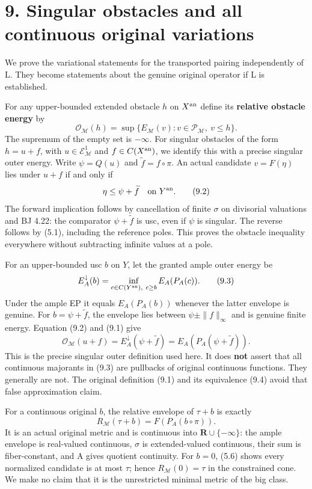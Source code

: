 \documentclass[
  10pt,
]{article}
\begin{document}
\section{9. Singular obstacles and all continuous original
variations}\label{singular-obstacles-and-all-continuous-original-variations}

We prove the variational statements for the transported pairing
independently of L. They become statements about the genuine original
operator if L is established.

For any upper-bounded extended obstacle \(h\) on \(X^{\rm an}\) define
its \textbf{relative obstacle energy} by \[
 \mathcal O_{\mathcal M}(h)=
   \sup\{E_{\mathcal M}(v):v\in\mathcal P_{\mathcal M},\ v\leq h\}.
 \tag{9.1}
\] The supremum of the empty set is \(-\infty\). For singular obstacles
of the form \(h=u+f\), with \(u\in\mathcal E^1_{\mathcal M}\) and
\(f\in C(X^{\rm an})\), we identify this with a precise singular outer
energy. Write \(\psi=Q(u)\) and \(\widetilde f=f\circ\pi\). An actual
candidate \(v=F(\eta)\) lies under \(u+f\) if and only if \[
 \eta\leq\psi+\widetilde f\quad\hbox{on }Y^{\rm an}.
 \tag{9.2}
\] The forward implication follows by cancellation of finite \(\sigma\)
on divisorial valuations and BJ 4.22: the comparator
\(\psi+\widetilde f\) is usc, even if \(\psi\) is singular. The reverse
follows by (5.1), including the reference poles. This proves the
obstacle inequality everywhere without subtracting infinite values at a
pole.

For an upper-bounded usc \(b\) on \(Y\), let the granted ample outer
energy be \[
 E_A^\downarrow(b)=\inf_{c\in C(Y^{\rm an}),\ c\geq b} E_A(P_A(c)).
 \tag{9.3}
\] Under the ample EP it equals \(E_A(P_A(b))\) whenever the latter
envelope is genuine. For \(b=\psi+\widetilde f\), the envelope lies
between \(\psi\pm\|f\|_\infty\) and is genuine finite energy. Equation
(9.2) and (9.1) give \[
 \mathcal O_{\mathcal M}(u+f)
   =E_A^\downarrow(\psi+\widetilde f)
   =E_A(P_A(\psi+\widetilde f)).
 \tag{9.4}
\] This is the precise singular outer definition used here. It does
\textbf{not} assert that all continuous majorants in (9.3) are pullbacks
of original continuous functions. They generally are not. The original
definition (9.1) and its equivalence (9.4) avoid that false
approximation claim.

For a continuous original \(b\), the relative envelope of \(\tau+b\) is
exactly \[
 R_{\mathcal M}(\tau+b)=F(P_A(b\circ\pi)).
 \tag{9.5}
\] It is an actual original metric and is continuous into
\(\mathbf R\cup\{-\infty\}\): the ample envelope is real-valued
continuous, \(\sigma\) is extended-valued continuous, their sum is
fiber-constant, and A gives quotient continuity. For \(b=0\), (5.6)
shows every normalized candidate is at most \(\tau\); hence
\(R_{\mathcal M}(0)=\tau\) in the constrained cone. We make no claim
that it is the unrestricted minimal metric of the big class.
\end{document}
